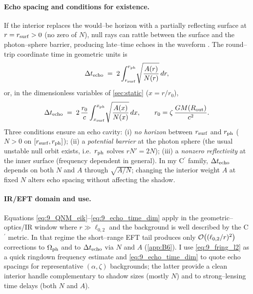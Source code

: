 \documentclass{iopjournal}
\begin{document}
\paragraph{Echo spacing and conditions for existence.}
If the interior replaces the would–be horizon with a partially reflecting surface at $r=r_{\rm surf}>0$ (no zero of $N$), null rays can rattle between the surface and the photon–sphere barrier, producing late–time echoes in the waveform \cite{CardosoEchoes2016}. The round–trip coordinate time in geometric units is
\begin{equation}
\Delta t_{\rm echo}\;=\;2\int_{r_{\rm surf}}^{r_{\rm ph}}\!\sqrt{\frac{A(r)}{N(r)}}\,dr,
\label{eq:9_echo_time_geom}
\end{equation}
or, in the dimensionless variables of \cref{sec:static} ($x=r/r_0$),
\begin{equation}
\Delta t_{\rm echo}\;=\;2\,\frac{r_0}{c}\int_{x_{\rm surf}}^{x_{\rm ph}}\!\sqrt{\frac{A(x)}{N(x)}}\,dx,
\qquad r_0=\zeta\,\frac{GM(R_{\rm out})}{c^{2}}.
\label{eq:9_echo_time_dim}
\end{equation}
Three conditions ensure an echo cavity: (i) \emph{no horizon} between $r_{\rm surf}$ and $r_{\rm ph}$ ($N>0$ on $[r_{\rm surf},r_{\rm ph}]$); (ii) a \emph{potential barrier} at the photon sphere (the usual unstable null orbit exists, i.e.\ $r_{\rm ph}$ solves $rN'=2N$); (iii) a \emph{nonzero reflectivity} at the inner surface (frequency dependent in general). In my C$^\prime$ family, $\Delta t_{\rm echo}$ depends on both $N$ and $A$ through $\sqrt{A/N}$; changing the interior weight $A$ at fixed $N$ alters echo spacing without affecting the shadow.

\paragraph{IR/EFT domain and use.}
Equations \eqref{eq:9_QNM_eik}–\eqref{eq:9_echo_time_dim} apply in the geometric–optics/IR window where $r\gg\ell_{0,2}$ and the background is well described by the C$^\prime$ metric. In that regime the short–range EFT tail produces only $\order{(\ell_{0,2}/r)^2}$ corrections to $\Omega_{\rm ph}$ and to $\Delta t_{\rm echo}$ via $N$ and $A$ (\cref{app:B6}). I use \eqref{eq:9_fring_l2} as a quick ringdown frequency estimate and \eqref{eq:9_echo_time_dim} to quote echo spacings for representative $(\alpha,\zeta)$ backgrounds; the latter provide a clean interior handle complementary to shadow sizes (mostly $N$) and to strong–lensing time delays (both $N$ and $A$).
\end{document}
